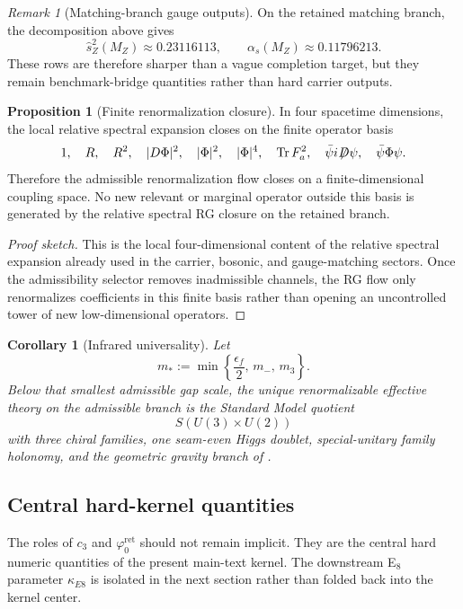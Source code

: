 \documentclass[11pt,a4paper]{article}
\newtheorem{corollary}[theorem]{Corollary}
\theoremstyle{definition}
\newtheorem{proposition}[theorem]{Proposition}
\theoremstyle{remark}
\newtheorem*{remark}{Remark}
\DeclareMathOperator{\tr}{Tr}
\newcommand{\cthree}{c_3}
\newcommand{\phiz}{\varphi_0^{\mathrm{ret}}}
\begin{document}
\begin{remark}[Matching-branch gauge outputs]
On the retained matching branch, the decomposition above gives
\[
\hat s_Z^2(M_Z)\approx \num{0.23116113},
\qquad
\alpha_s(M_Z)\approx \num{0.11796213}.
\]
These rows are therefore sharper than a vague completion target, but they remain benchmark-bridge quantities rather than hard carrier outputs.
\end{remark}

\begin{proposition}[Finite renormalization closure]
In four spacetime dimensions, the local relative spectral expansion closes on the finite operator basis
\[
1,\quad
R,\quad
R^2,\quad
|D\Phi|^2,\quad
|\Phi|^2,\quad
|\Phi|^4,\quad
\tr F_a^2,\quad
\bar\psi i\!\not\!\!D\psi,\quad
\bar\psi\Phi\psi.
\]
Therefore the admissible renormalization flow closes on a finite-dimensional coupling space. No new relevant or marginal operator outside this basis is generated by the relative spectral RG closure on the retained branch.
\end{proposition}

\begin{proof}[Proof sketch]
This is the local four-dimensional content of the relative spectral expansion already used in the carrier, bosonic, and gauge-matching sectors. Once the admissibility selector removes inadmissible channels, the RG flow only renormalizes coefficients in this finite basis rather than opening an uncontrolled tower of new low-dimensional operators.
\end{proof}

\begin{corollary}[Infrared universality]
Let
\[
m_*:=\min\left\{\frac{\epsilon_f}{2},\,m_-,\,m_3\right\}.
\]
Below that smallest admissible gap scale, the unique renormalizable effective theory on the admissible branch is the Standard Model quotient
\[
S(U(3)\times U(2))
\]
with three chiral families, one seam-even Higgs doublet, special-unitary family holonomy, and the geometric gravity branch of .
\end{corollary}

\subsection{Central hard-kernel quantities}

The roles of $\cthree$ and $\phiz$ should not remain implicit. They are the central hard numeric quantities of the present main-text kernel. The downstream E$_8$ parameter $\kappa_{E8}$ is isolated in the next section rather than folded back into the kernel center.
\end{document}
